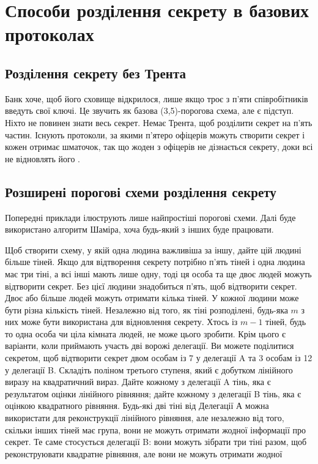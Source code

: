 \chapter{Способи розділення секрету в базових протоколах}
\label{chap:review2}

\section{Розділення секрету без Трента}
Банк хоче, щоб його сховище відкрилося, лише якщо троє з п’яти співробітників введуть свої ключі. Це звучить як базова (3,5)-порогова схема, але є підступ. Ніхто не повинен знати весь секрет. Немає Трента, щоб розділити секрет на п’ять частин. Існують протоколи, за якими п’ятеро офіцерів можуть створити секрет і кожен отримає шматочок, так що жоден з офіцерів не дізнається секрету, доки всі не відновлять його \cite{appCrypto}.

\section{Розширені порогові схеми розділення секрету}
Попередні приклади ілюструють лише найпростіші порогові схеми. Далі буде використано алгоритм Шаміра, хоча будь-який з інших буде працювати.

Щоб створити схему, у якій одна людина важливіша за іншу, дайте цій людині більше тіней. Якщо для відтворення секрету потрібно п’ять тіней і одна людина має три тіні, а всі інші мають лише одну, тоді ця особа та ще двоє людей можуть відтворити секрет. Без цієї людини знадобиться п’ять, щоб відтворити секрет.
Двоє або більше людей можуть отримати кілька тіней. У кожної людини може бути різна кількість тіней. Незалежно від того, як тіні розподілені, будь-яка $m$ з них може бути використана для відновлення секрету. Хтось із $m-1$ тіней, будь то одна особа чи ціла кімната людей, не може цього зробити.
Крім цього є варіанти, коли приймають участь дві ворожі делегації. 
Ви можете поділитися секретом, щоб відтворити секрет двом особам із 7 у делегації A та 3 особам із 12 у делегації B. Складіть поліном третього ступеня, який є добутком лінійного виразу на квадратичний вираз. Дайте кожному з делегації A тінь, яка є результатом оцінки лінійного рівняння; дайте кожному з делегації B тінь, яка є оцінкою квадратного рівняння.
Будь-які дві тіні від Делегації А можна використати для реконструкції лінійного рівняння, але незалежно від того, скільки інших тіней має група, вони не можуть отримати жодної інформації про секрет. Те саме стосується делегації B: вони можуть зібрати три тіні разом, щоб реконструювати квадратне рівняння, але вони не можуть отримати жодної

